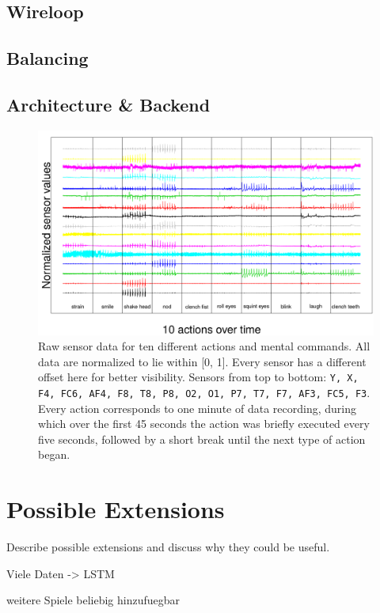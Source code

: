 \documentclass{utue} %
\begin{document}
\subsection{Wireloop}
\subsection{Balancing}

\subsection{Architecture \& Backend}


\begin{figure}[h!]
	\centering
	\includegraphics[width=1.0\textwidth]{images/sensor_values.png}
	\caption{Raw sensor data for ten different actions and mental commands. All data are normalized to lie within [0, 1]. Every sensor has a different offset here for better visibility. Sensors from top to bottom: \texttt{Y, X, F4, FC6, AF4, F8, T8, P8, O2, O1, P7, T7, F7, AF3, FC5, F3}. Every action corresponds to one minute of data recording, during which over the first 45 seconds the action was briefly executed every five seconds, followed by a short break until the next type of action began.}
	\label{fig:sensor_values}
\end{figure}

\section{Possible Extensions}

Describe possible extensions and discuss why they could be useful.

Viele Daten -> LSTM

weitere Spiele beliebig hinzufuegbar
\end{document}
